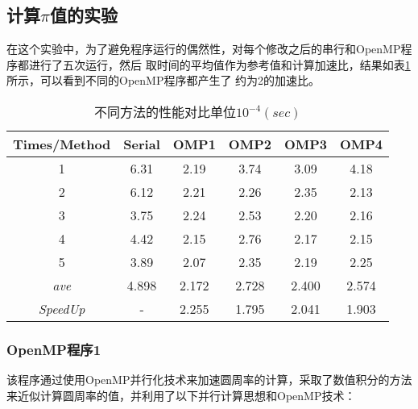 \documentclass{article}
\begin{document}
\subsection{计算$\pi$值的实验}
在这个实验中，为了避免程序运行的偶然性，对每个修改之后的串行和OpenMP程序都进行了五次运行，然后
取时间的平均值作为参考值和计算加速比，结果如表\ref{tab:4}所示，可以看到不同的OpenMP程序都产生了
约为2的加速比。
\begin{table}[h]
    \centering
    \caption{不同方法的性能对比单位$10^{-4}(sec)$}
    \label{tab:4}
    \begin{tabular}{@{}cccccc@{}}
    \toprule
    Times/Method & Serial & OMP1 & OMP2 & OMP3 & OMP4 \\ \midrule
    1            & 6.31   & 2.19  & 3.74  & 3.09  & 4.18  \\
    2            & 6.12   & 2.21  & 2.26  & 2.35  & 2.13  \\
    3            & 3.75   & 2.24  & 2.53  & 2.20  & 2.16  \\
    4            & 4.42   & 2.15  & 2.76  & 2.17  & 2.15  \\
    5            & 3.89   & 2.07  & 2.35  & 2.19  & 2.25  \\
    \textit{ave} & 4.898  & 2.172 & 2.728 & 2.400 & 2.574 \\
    \textit{SpeedUp} & -     & 2.255 & 1.795 & 2.041 & 1.903 \\ \bottomrule
    \end{tabular}
\end{table}
\subsubsection{OpenMP程序1}
该程序通过使用OpenMP并行化技术来加速圆周率的计算，采取了数值积分的方法来近似计算圆周率的值，并利用了以下并行计算思想和OpenMP技术：
\end{document}
